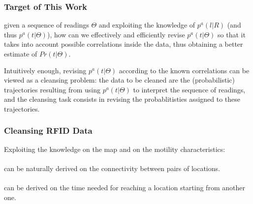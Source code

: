 \begin{frame}
\begin{columns}

\end{columns}

\end{frame}


\begin{frame}
\frametitle{Target of This Work}

\begin{problem}
  given a sequence of readings $\Theta$ and exploiting the knowledge of $p^a(l|R)$ (and thus $p^a(t|\Theta)$), how can we effectively and efficiently revise $p^a(t|\Theta)$ so that it takes into account possible correlations inside the data, thus obtaining a better estimate of $Pr(t|\Theta)$.
\end{problem}

Intuitively enough, revising $p^a(t|\Theta)$ according to the known correlations can be viewed as a cleansing problem: the data to be cleaned are the (probabilistic) trajectories resulting from using $p^a(t|\Theta)$ to interpret the sequence of readings, and the cleansing task consists in revising the probablitisties assigned to these trajectories.

\end{frame}


\begin{frame}
\frametitle{Cleansing RFID Data}

Exploiting the knowledge on the map and on the motility characteristics:\\~\\

 can be naturally derived on the connectivity between pairs of locations.\\~\\

 can be derived on the time needed for reaching a location starting from another one.

\end{frame}


